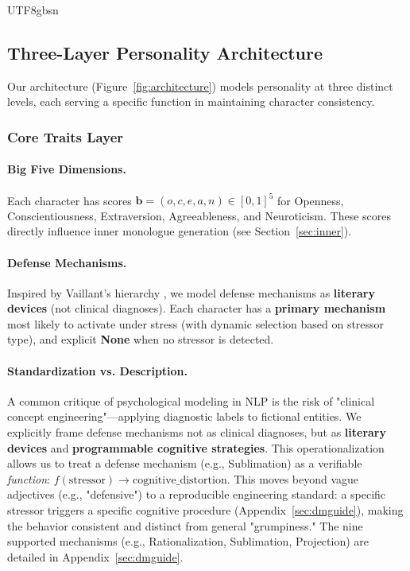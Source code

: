 \documentclass[11pt]{article}
\begin{document}
\begin{CJK*}{UTF8}{gbsn}
\subsection{Three-Layer Personality Architecture}

Our architecture (Figure~\ref{fig:architecture}) models personality at three distinct levels, each serving a specific function in maintaining character consistency.

\subsubsection{Core Traits Layer}

\paragraph{Big Five Dimensions.} Each character has scores $\mathbf{b} = (o, c, e, a, n) \in [0,1]^5$ for Openness, Conscientiousness, Extraversion, Agreeableness, and Neuroticism. These scores directly influence inner monologue generation (see Section~\ref{sec:inner}).

\paragraph{Defense Mechanisms.} Inspired by Vaillant's hierarchy \citep{vaillant1994ego}, we model defense mechanisms as \textbf{literary devices} (not clinical diagnoses). Each character has a \textbf{primary mechanism} most likely to activate under stress (with dynamic selection based on stressor type), and explicit \textbf{None} when no stressor is detected.
\paragraph{Standardization vs. Description.} A common critique of psychological modeling in NLP is the risk of "clinical concept engineering"---applying diagnostic labels to fictional entities. We explicitly frame defense mechanisms not as clinical diagnoses, but as \textbf{literary devices} and \textbf{programmable cognitive strategies}. This operationalization allows us to treat a defense mechanism (e.g., Sublimation) as a verifiable \textit{function}: $f(\text{stressor}) \rightarrow \text{cognitive\_distortion}$. This moves beyond vague adjectives (e.g., "defensive") to a reproducible engineering standard: a specific stressor triggers a specific cognitive procedure (Appendix~\ref{sec:dmguide}), making the behavior consistent and distinct from general "grumpiness."
    The nine supported mechanisms (e.g., Rationalization, Sublimation, Projection) are detailed in Appendix~\ref{sec:dmguide}.


\end{CJK*}
\end{document}

